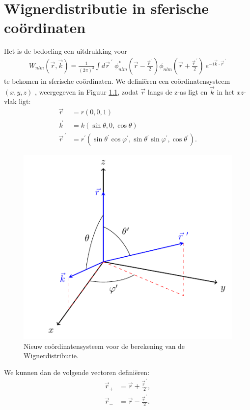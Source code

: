 \documentclass[11pt,twoside]{book}
\begin{document}
\chapter{Wignerdistributie in sferische co\"{o}rdinaten}
Het is de bedoeling een uitdrukking voor
\begin{align}
W_{nlm}(\vec{r},\vec{k}) = \frac{1}{(2\pi)^3} \int d\vec{r}^{\ \prime} \ \phi_{nlm}^*\left(\vec{r}-\frac{\vec{r}^{\ \prime}}{2}\right) \phi_{nlm}\left(\vec{r}+\frac{\vec{r}^{\ \prime}}{2}\right)\  e^{-i\vec{k}\cdot \vec{r}^{\ \prime}} 
\end{align}
te bekomen in sferische co\"{o}rdinaten.
We defini\"{e}ren een co\"{o}rdinatensysteem $(x,y,z)$ , weergegeven in Figuur \ref{fig:coordinatesystem}, zodat  $\vec{r}$ langs de z-as ligt en $\vec{k}$ in het $xz$-vlak ligt:
\begin{align*}
\vec{r} & = r(0,0,1) \\
\vec{k} & = k(\sin \theta,0,\cos \theta) \\
\vec{r}^{\ \prime} & = r^{\prime}(\sin \theta^{\prime} \cos  \varphi^{\prime},\sin \theta^{\prime} \sin  \varphi^{\prime},\cos \theta^{\prime}).
\end{align*}
\begin{figure}[H]
\centering
\includegraphics[scale=1.2]{./figuren/coordinate}
\caption{Nieuw co\"{o}rdinatensysteem voor de berekening van de Wignerdistributie.}
\label{fig:coordinatesystem}
\end{figure}
We kunnen dan de volgende vectoren defini\"{e}ren:
\begin{align*}
\vec{r}_+  & =   \vec{r}+\frac{\vec{r}^{\ \prime}}{2}, \\
\vec{r}_-  & =   \vec{r}-\frac{\vec{r}^{\ \prime}}{2}.
\end{align*}
\end{document}
